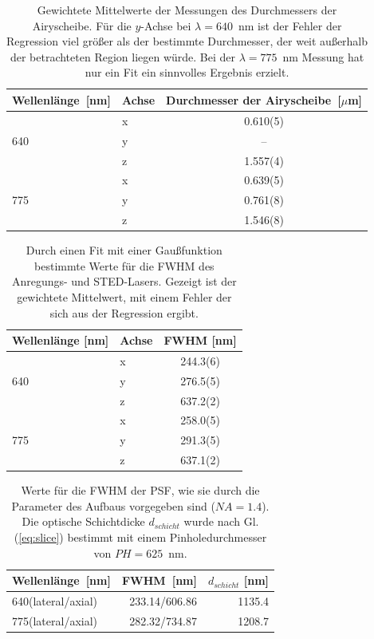 \begin{table}
	\centering
	\caption{
		Gewichtete Mittelwerte der Messungen des Durchmessers der Airyscheibe.
Für die $y$-Achse bei $\lambda = 640$~nm ist der Fehler der Regression viel größer als der bestimmte Durchmesser, der weit außerhalb der betrachteten Region liegen würde.
Bei der $\lambda = 775$~nm Messung hat nur ein Fit ein sinnvolles Ergebnis erzielt.}
	\begin{tabular}{l|l|c}
		Wellenlänge~[nm] & Achse & Durchmesser der Airyscheibe~[$\mu$m] \\ \hline 
		    &x&0.610(5)\\
		 640&y&--\\ 
		    &z&1.557(4)\\ \hline
		    &x&0.639(5)\\
		 775&y&0.761(8)\\
		    &z&1.546(8)\\
	\end{tabular}\label{tab:psffits}
\end{table}
\begin{table}
\centering
\caption{Durch einen Fit mit einer Gaußfunktion bestimmte Werte für die FWHM des Anregungs- und STED-Lasers. Gezeigt ist der gewichtete Mittelwert, mit einem Fehler der sich aus der Regression ergibt.}\label{tab:psffwhm}
\begin{tabular}{l|l|c}
	Wellenlänge [nm]& Achse & FWHM [nm] \\ \hline
	   &x&244.3(6)\\
	640&y&276.5(5)\\
	   &z&637.2(2)\\ \hline
	   &x&258.0(5)\\
	775&y&291.3(5)\\
	   &z&637.1(2)\\
\end{tabular}
\end{table}
\begin{table}
	\centering
	\caption{Werte für die FWHM der PSF, wie sie durch die Parameter des Aufbaus vorgegeben sind ($NA=1.4$). Die optische Schichtdicke $d_{schicht}$ wurde nach Gl. (\ref{eq:slice}) bestimmt mit einem Pinholedurchmesser von $PH = 625$~nm.}\label{tab:fwhmaufbau}
	\begin{tabular}{l|rr}
		Wellenlänge~[nm] & FWHM~[nm] & $d_{schicht}$ [nm]\\ \hline
		640(lateral/axial) & 233.14/606.86 & 1135.4\\
		775(lateral/axial) & 282.32/734.87 & 1208.7
	\end{tabular}
\end{table}

